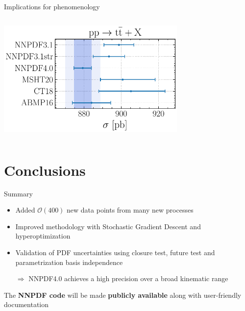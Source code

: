 \documentclass[aspectratio=169,9pt]{beamer}
\begin{document}
\begin{frame}[t]{Implications for phenomenology}
\begin{center}
\begin{columns}
\begin{column}{0.48\textwidth}
        	        \includegraphics[width=0.7\textwidth]{NNPDF_TTB_14TEV_40_PHENO-integrated}
	        \end{column}
        \end{columns}
    \end{center}
\end{frame}





\section*{Conclusions}



\begin{frame}[t]{Summary}
    \begin{itemize}
        \item Added $\mathcal{O}(400)$ new data points from many new processes
        \item Improved methodology with Stochastic Gradient Descent and hyperoptimization
        \item Validation of PDF uncertainties using closure test, future test and parametrization basis independence
        \item[$\Rightarrow$] NNPDF4.0 achieves a high precision over a broad kinematic range
    \end{itemize}
    \vspace*{2em}
    \begin{block}{}
        \centering
        The {\bf NNPDF code} will be made {\bf publicly available} along with user-friendly documentation
    \end{block}
    \vspace*{2em}
\end{frame}



\end{document}
